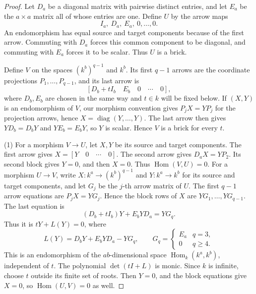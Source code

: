 \documentclass[a4paper,reqno,10pt]{amsart}
\theoremstyle{definition}
\numberwithin{equation}{section}
\newcommand{\Hom}{\operatorname{Hom}}
\begin{document}
\begin{proof}
Let $D_a$ be a diagonal matrix with pairwise distinct entries, and let
$E_a$ be the $a\times a$ matrix all of whose entries are one. Define $U$
by the arrow maps
\[
 I_a,\ D_a,\ E_a,\ 0,\ldots,0.
\]
An endomorphism has equal source and target components because of the
first arrow. Commuting with $D_a$ forces this common component to be
diagonal, and commuting with $E_a$ forces it to be scalar. Thus $U$ is
a brick.

Define $V$ on the spaces $(k^b)^{q-1}$ and $k^b$. Its first $q-1$
arrows are the coordinate projections $P_1,\ldots,P_{q-1}$, and its
last arrow is
\[
 [D_b+tI_b\quad E_b\quad 0\quad\cdots\quad0],
\]
where $D_b,E_b$ are chosen in the same way and $t\in k$ will be fixed
below. If $(X,Y)$ is an endomorphism of $V$, our morphism convention
gives $P_jX=YP_j$ for the projection arrows, hence
$X=\operatorname{diag}(Y,\ldots,Y)$. The last arrow then gives
$YD_b=D_bY$ and $YE_b=E_bY$, so $Y$ is scalar. Hence $V$ is a brick
for every $t$.

(1) For a morphism $V\to U$, let $X,Y$ be its source and target components.
The first arrow gives $X=[Y\quad0\quad\cdots\quad0]$.
The second arrow gives $D_aX=YP_2$. Its second block gives $Y=0$, and then
$X=0$. Thus $\Hom(V,U)=0$.
For a morphism $U\to V$, write
$X:k^a\to(k^b)^{q-1}$ and $Y:k^a\to k^b$ for its source and target
components, and let $G_j$ be the $j$-th arrow matrix of $U$. The first
$q-1$ arrow equations are
$P_jX=YG_j$. Hence the block rows of $X$ are
$YG_1,\ldots,YG_{q-1}$.
The last equation is
\[
 (D_b+tI_b)Y+E_bYD_a=YG_q.
\]
Thus it is $tY+L(Y)=0$, where
\[
 L(Y)=D_bY+E_bYD_a-YG_q,\qquad
 G_q=\begin{cases}E_a&q=3,\\0&q\geq4.\end{cases}
\]
This is an endomorphism of the $ab$-dimensional space
$\Hom_{k}(k^a,k^b)$, independent of $t$. The polynomial
$\det(tI+L)$ is monic. Since $k$ is infinite, choose $t$ outside
its finite set of roots.
Then $Y=0$, and the block equations give $X=0$, so
$\Hom(U,V)=0$ as well.


\end{proof}
\end{document}
